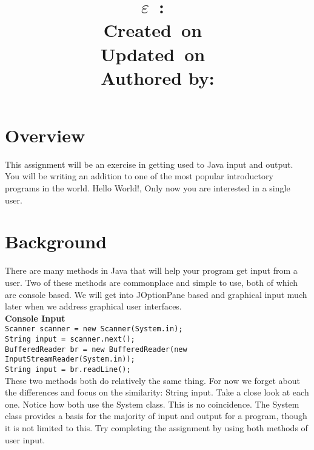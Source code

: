 \documentclass{report}
\title{
\vspace{2in}
\textmd{\textbf{\hmwkDesDiff$\varepsilon$\hmwkDesTime\ :\ \hmwkTitle}}\\
\normalsize\vspace{0.1in}\small{Created\ on\ \hmwkCreationDate}\\
\normalsize\vspace{0.1in}\small{Updated\ on\ \hmwkUpdateDate}\\
\vspace{3in}
Authored by:
}
\author{\textbf{\hmwkAuthorName}}
\date{}
\begin{document}
\maketitle



\newpage
\tableofcontents
\newpage


\section{Overview}
\hspace{2em}\large{This assignment will be an exercise in getting used to Java input and output. You will be writing an addition to one of the most popular introductory programs in the world. Hello World!, Only now you are interested in a single user.}\\

\section{Background}
\hspace{2em}\large{There are many methods in Java that will help your program get input from a user. Two of these methods are commonplace and simple to use, both of which are console based. We will get into JOptionPane based and graphical input much later when we address graphical user interfaces.\\

\textbf{Console Input}\hrulefill\\

\texttt{Scanner scanner = new Scanner(System.in);\\
String input = scanner.next();}\\

\texttt{BufferedReader br = new BufferedReader(new InputStreamReader(System.in));\\
String input = br.readLine();}\\

\hspace{2em}These two methods both do relatively the same thing. For now we forget about the differences and focus on the similarity: String input. Take a close look at each one. Notice how both use the System class. This is no coincidence. The System class provides a basis for the majority of input and output for a program, though it is not limited to this. Try completing the assignment by using both methods of user input.\\
}
\end{document}

